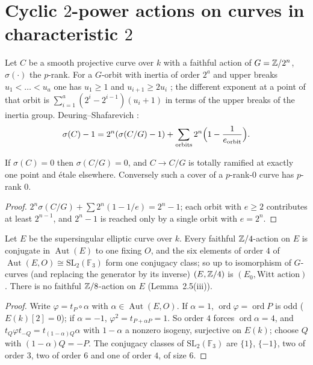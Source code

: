 \section{Cyclic \texorpdfstring{$2$}{2}-power actions on curves in characteristic
\texorpdfstring{$2$}{2}}\label{app:RH}

Let $C$ be a smooth projective curve over $k$ with a faithful action of $G=\mathbb Z/2^n$,
$\sigma(\cdot)$ the $p$-rank. For a $G$-orbit with inertia of order $2^a$ and upper
breaks $u_1<\dots<u_a$ one has $u_1\ge1$ and $u_{i+1}\ge2u_i$ \cite{Ga,Th}; the different
exponent at a point of that orbit is $\sum_{i=1}^a(2^i-2^{i-1})(u_i+1)$ in terms of the
upper breaks of the inertia group. Deuring--Shafarevich \cite{Cr}:
\[
\sigma(C)-1=2^n(\sigma(C/G)-1)+\sum_{\text{orbits}}2^n\Bigl(1-\frac1{e_{\rm orbit}}\Bigr).
\]

\begin{lemma}\label{lem:prank0}
If $\sigma(C)=0$ then $\sigma(C/G)=0$, and $C\to C/G$ is totally ramified at exactly
one point and \'etale elsewhere. Conversely such a cover of a $p$-rank-$0$ curve has
$p$-rank $0$. 
\end{lemma}

\begin{proof}
$2^n\sigma(C/G)+\sum2^n(1-1/e)=2^n-1$; each orbit with $e\ge2$ contributes at least
$2^{n-1}$, and $2^n-1$ is reached only by a single orbit with $e=2^n$.
\end{proof}

\begin{lemma}\label{lem:Z4ss}
Let $E$ be the supersingular elliptic curve over $k$. Every faithful $\mathbb Z/4$-action on
$E$ is conjugate in $\operatorname{Aut}(E)$ to one fixing $O$, and the six elements of
order $4$ of $\operatorname{Aut}(E,O)\cong\mathrm{SL}_2(\mathbb F_3)$ form one conjugacy
class; so up to isomorphism of $G$-curves (and replacing the generator by its inverse)
$(E,\mathbb Z/4)$ is $(E_0,\text{Witt action})$. There is no faithful $\mathbb Z/8$-action on $E$
(Lemma~2.5(iii)). 
\end{lemma}

\begin{proof}
Write $\varphi=t_P\circ\alpha$ with $\alpha\in\operatorname{Aut}(E,O)$. If $\alpha=1$,
$\operatorname{ord}\varphi=\operatorname{ord}P$ is odd ($E(k)[2]=0$); if $\alpha=-1$,
$\varphi^2=t_{P+\alpha P}=1$. So order $4$ forces $\operatorname{ord}\alpha=4$, and
$t_Q\varphi t_{-Q}=t_{(1-\alpha)Q}\alpha$ with $1-\alpha$ a nonzero isogeny, surjective
on $E(k)$; choose $Q$ with $(1-\alpha)Q=-P$. The conjugacy classes of
$\mathrm{SL}_2(\mathbb F_3)$ are $\{1\}$, $\{-1\}$, two of order $3$, two of order $6$
and one of order $4$, of size $6$.
\end{proof}

